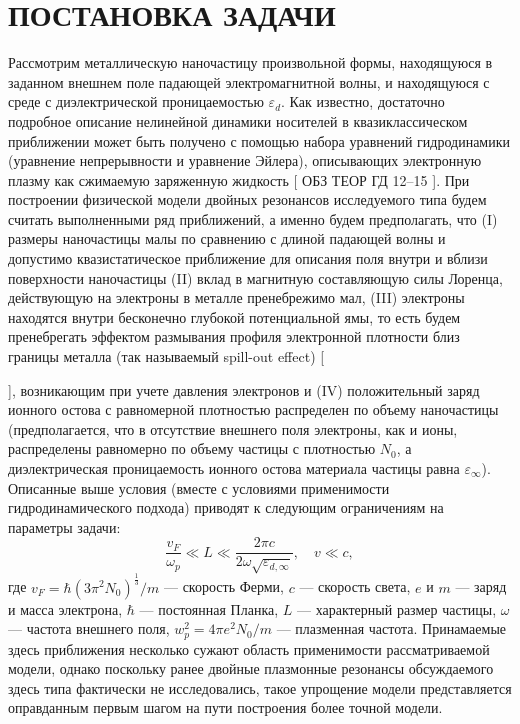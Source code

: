 \documentclass[12pt, a4paper]{article}
\def \eps {\varepsilon}
\def \w {\omega}
\begin{document}
\section{ПОСТАНОВКА ЗАДАЧИ}

Рассмотрим металлическую наночастицу произвольной формы, находящуюся в заданном внешнем поле падающей электромагнитной волны, и находящуюся с среде с диэлектрической проницаемостью $\eps_d$. Как известно, достаточно подробное описание нелинейной динамики носителей в квазиклассическом приближении может быть получено с помощью набора уравнений гидродинамики (уравнение непрерывности и уравнение Эйлера), описывающих электронную плазму как сжимаемую заряженную жидкость [
ОБЗ ТЕОР ГД  12–15
]. 
При построении физической модели двойных резонансов исследуемого типа будем считать выполненными ряд приближений, а именно будем предполагать, что (I) размеры наночастицы малы по сравнению с длиной падающей волны и допустимо квазистатическое приближение для описания поля внутри и вблизи поверхности наночастицы (II) вклад в магнитную составляющую силы Лоренца, действующую на электроны в металле пренебрежимо мал, (III) электроны находятся внутри бесконечно глубокой потенциальной ямы, то есть будем пренебрегать эффектом размывания профиля электронной плотности близ границы металла (так называемый spill-out effect) [

], возникающим при учете давления электронов и (IV) положительный заряд ионного остова с равномерной плотностью распределен по объему наночастицы (предполагается, что в отсутствие внешнего поля электроны, как и ионы, распределены равномерно по объему частицы с плотностью $N_0$, а диэлектрическая проницаемость ионного остова материала частицы равна $\eps_\infty$). Описанные выше условия (вместе с условиями применимости гидродинамического подхода) приводят к следующим ограничениям на параметры задачи: 
\begin{equation} 	
\frac{v_F}{\omega_p} \ll L \ll \frac{2\pi c}{2\omega\sqrt{\eps_{d, \infty}}},  \quad v \ll c, 
\end{equation} 
где $v_F = \hbar (3 \pi^2 N_0)^\frac{1}{3}/m $ — скорость Ферми, $c$ — скорость света, $e$ и $m$ — заряд и масса электрона, $\hbar$ — постоянная Планка, $L$ — характерный размер частицы, $\w$ — частота внешнего поля, $ w_p^2 = 4 \pi e^2 N_0 / m$  — плазменная частота. Принамаемые здесь приближения несколько сужают область применимости рассматриваемой модели, однако поскольку ранее двойные плазмонные резонансы обсуждаемого здесь типа фактически не исследовались, такое упрощение модели представляется оправданным первым шагом на пути построения более точной модели. 
\end{document}
